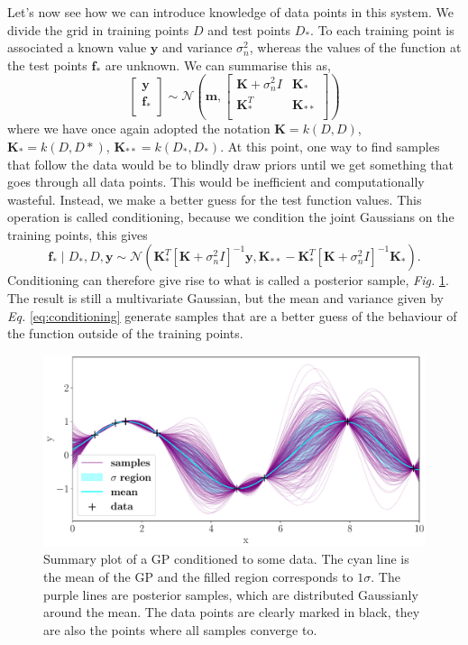 Let's now see how we can introduce knowledge of data points in this system. We divide the grid in training points $D$ and test points $D_*$. To each training point is associated a known value $\bm{y}$ and variance $\sigma_n^2$, whereas the values of the function at the test points $\bm{f}_*$ are unknown. We can summarise this as,
\begin{equation}
    \begin{bmatrix}
    \bm{y} \\
    \bm{f}_* \\
    \end{bmatrix}
    \sim \mathcal{N}\left(\bm{m}, \begin{bmatrix}
    \bm{K} + \sigma_n^2 I & \bm{K}_* \\
    \bm{K}^T_* & \bm{K}_{**} \\
    \end{bmatrix}\right)
\end{equation}
where we have once again adopted the notation $\bm{K}=k(D,D)$, $\bm{K_{*}}=k(D,D*)$, $\bm{K_{**}}=k(D_*,D_*)$. At this point, one way to find samples that follow the data would be to blindly draw priors until we get something that goes through all data points. This would be inefficient and computationally wasteful. Instead, we make a better guess for the test function values. This operation is called conditioning, because we condition the joint Gaussians on the training points, this gives
\begin{equation}
\bm{f}_* \mid D_*, D, \bm{y} \sim \mathcal{N}\left( \bm{K}^T_* [\bm{K} + \sigma_n^2 I]^{-1} \bm{y} , \bm{K}_{**} - \bm{K}^T_* [\bm{K} + \sigma_n^2 I]^{-1} \bm{K}_* \right).
\label{eq:conditioning}
\end{equation}
Conditioning can therefore give rise to what is called a posterior sample, \textit{Fig. }\ref{fig:posteriors}. The result is still a multivariate Gaussian, but the mean and variance given by \textit{Eq. }\eqref{eq:conditioning} generate samples that are a better guess of the behaviour of the function outside of the training points.
\begin{figure}[h]
    \centering
    \includegraphics[width=\textwidth]{images/1_posteriors.pdf}
    \caption{\label{fig:posteriors} Summary plot of a GP conditioned to some data. The cyan line is the mean of the GP and the filled region corresponds to $1\sigma$. The purple lines are posterior samples, which are distributed Gaussianly around the mean. The data points are clearly marked in black, they are also the points where all samples converge to.}
\end{figure}

